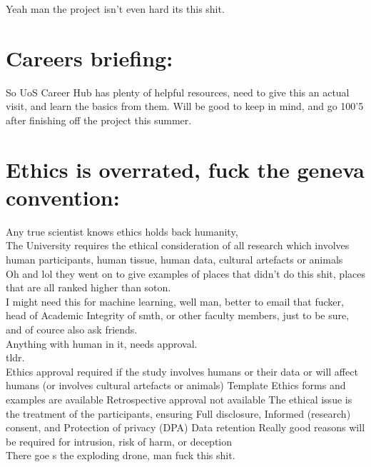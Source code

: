 \documentclass [12pt]{article}
\begin{document}
Yeah man the project isn't even hard its this shit.\\ 

\section{Careers briefing:}

So UoS Career Hub has plenty of helpful resources, need to give this an actual visit, and learn the basics from them. Will be good to keep in mind, and go 100'5 after finishing off the project this summer.\\





\section{Ethics is overrated, fuck the geneva convention:}

Any true scientist knows ethics holds back humanity,\\ 

The University requires the ethical consideration of all research which involves human participants, human tissue, human data, cultural artefacts or animals\\

Oh and lol they went on to give examples of places that didn't do this shit, places that are all ranked higher than soton.\\ 

I might need this for machine learning, well man, better to email that fucker, head of Academic Integrity of smth, or other faculty members, just to be sure, and of cource also ask friends.\\ 

Anything with human in it, needs approval.\\ 
tldr.\\ 

Ethics approval required if the study involves humans or their data or will affect humans (or involves cultural artefacts or animals)
Template Ethics forms and examples are available
Retrospective approval not available
The ethical issue is the treatment of the participants, ensuring
	Full disclosure, 
	Informed (research) consent, and 
	Protection of privacy (DPA)
	Data retention
Really good reasons will be required for intrusion, risk of harm, or deception \\

There goe s the exploding drone, man fuck this shit.\\
\end{document}
